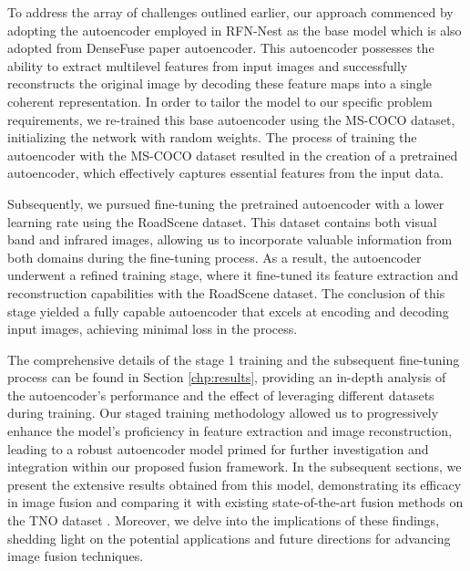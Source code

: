 To address the array of challenges outlined earlier, our approach commenced by adopting the autoencoder employed in RFN-Nest \cite{li2021rfn} as the base model which is also adopted from DenseFuse \cite{li2019infrared} paper autoencoder. This autoencoder possesses the ability to extract multilevel features from input images and successfully reconstructs the original image by decoding these feature maps into a single coherent representation. In order to tailor the model to our specific problem requirements, we re-trained this base autoencoder using the MS-COCO \cite{lin2014microsoft} dataset, initializing the network with random weights. The process of training the autoencoder with the MS-COCO dataset resulted in the creation of a pretrained autoencoder, which effectively captures essential features from the input data.

Subsequently, we pursued fine-tuning the pretrained autoencoder with a lower learning rate using the RoadScene \cite{xu2020aaai} dataset. This dataset contains both visual band and infrared images, allowing us to incorporate valuable information from both domains during the fine-tuning process. As a result, the autoencoder underwent a refined training stage, where it fine-tuned its feature extraction and reconstruction capabilities with the RoadScene dataset. The conclusion of this stage yielded a fully capable autoencoder that excels at encoding and decoding input images, achieving minimal loss in the process.

The comprehensive details of the stage 1 training and the subsequent fine-tuning process can be found in Section \ref{chp:results}, providing an in-depth analysis of the autoencoder's performance and the effect of leveraging different datasets during training. Our staged training methodology allowed us to progressively enhance the model's proficiency in feature extraction and image reconstruction, leading to a robust autoencoder model primed for further investigation and integration within our proposed fusion framework. In the subsequent sections, we present the extensive results obtained from this model, demonstrating its efficacy in image fusion and comparing it with existing state-of-the-art fusion methods on the TNO dataset \cite{toet2014tno}. Moreover, we delve into the implications of these findings, shedding light on the potential applications and future directions for advancing image fusion techniques. 

